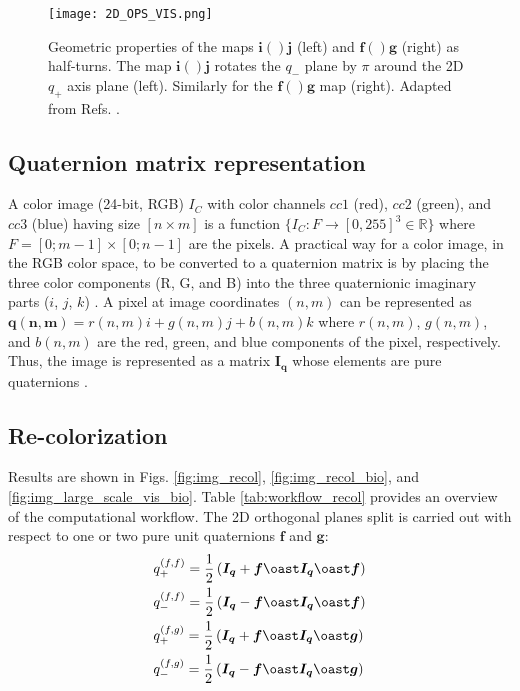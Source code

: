 \documentclass[superscriptaddress,longbibliography,aps,prl,twocolumn,10pt]{revtex4-2}
\begin{document}
\begin{figure}[t]
\centering
\texttt{[image: 2D\_OPS\_VIS.png]}
\vspace{-12pt}
\caption{\footnotesize{Geometric properties of the maps $\boldsymbol{i}()\boldsymbol{j}$ (left) and $\boldsymbol{f}()\boldsymbol{g}$ (right) as half-turns. The map $\boldsymbol{i}()\boldsymbol{j}$ rotates the $q_{-}$ plane by $\pi$ around the 2D $q_{+}$ axis plane (left). Similarly for the $\boldsymbol{f}()\boldsymbol{g}$ map (right). Adapted from Refs. \cite{HitzerSangwine2013, Hitzer2015}.}}
\label{fig:ops_geo}
\end{figure}

\subsection*{\normalsize{Quaternion matrix representation}}
A color image (24-bit, RGB) $I_C$ with color channels $cc1$ (red), $cc2$ (green), and $cc3$ (blue) having size $[n \times m]$ is a function $\{ I_C: F \longrightarrow [0,255]^3 \in \mathbb{R} \}$ where $F=[0;m-1] \times [0;n-1]$ are the pixels. A practical way for a color image, in the RGB color space, to be converted to a quaternion matrix is by placing the three color components (R, G, and B) into the three quaternionic imaginary parts ($i$, $j$, $k$) \cite{Moxey2003}. A pixel at image coordinates $(n, m)$ can be represented as $\boldsymbol{q(n,m)}=r(n,m)i+g(n,m)j+b(n,m)k$ where $r(n,m)$, $g(n,m)$, and $b(n,m)$ are the red, green, and blue components of the pixel, respectively. Thus, the image is represented as a matrix $\boldsymbol{I_{q}}$ whose elements are pure quaternions \cite{Ell2007a}.

\subsection*{\normalsize{Re-colorization}}
Results are shown in Figs. \ref{fig:img_recol}, \ref{fig:img_recol_bio}, and \ref{fig:img_large_scale_vis_bio}. Table \ref{tab:workflow_recol} provides an overview of the computational workflow. The 2D orthogonal planes split is carried out with respect to one or two pure unit quaternions $\boldsymbol{f}$ and $\boldsymbol{g}$:
    \begin{equation} \label{eq:recolorization}
    \begin{aligned}
        &q_{+}^{\left(f,f\right)} = \frac{1}{2} \left(\boldsymbol{I_{q}} + \boldsymbol{f} \oast \boldsymbol{I_{q}} \oast \boldsymbol{f} \right)\\
        &q_{-}^{\left(f,f\right)} = \frac{1}{2} \left(\boldsymbol{I_{q}} - \boldsymbol{f} \oast \boldsymbol{I_{q}} \oast \boldsymbol{f} \right)\\
        &q_{+}^{\left(f,g\right)} = \frac{1}{2} \left(\boldsymbol{I_{q}} + \boldsymbol{f} \oast \boldsymbol{I_{q}} \oast \boldsymbol{g} \right)\\
        &q_{-}^{\left(f,g\right)} = \frac{1}{2} \left(\boldsymbol{I_{q}} - \boldsymbol{f} \oast \boldsymbol{I_{q}} \oast \boldsymbol{g} \right)
    \end{aligned}
    \end{equation}
\end{document}
